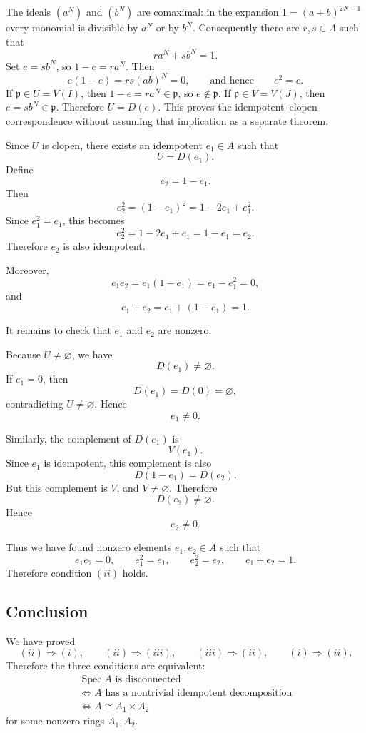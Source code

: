 The ideals $(a^N)$ and $(b^N)$ are comaximal: in the expansion
$1=(a+b)^{2N-1}$ every monomial is divisible by $a^N$ or by $b^N$.
Consequently there are $r,s\in A$ such that
\[
ra^N+sb^N=1.
\]
Set $e=sb^N$, so $1-e=ra^N$. Then
\[
e(1-e)=rs(ab)^N=0,
\qquad\text{and hence}\qquad e^2=e.
\]
If $\mathfrak p\in U=V(I)$, then $1-e=ra^N\in\mathfrak p$,
so $e\notin\mathfrak p$. If $\mathfrak p\in V=V(J)$, then
$e=sb^N\in\mathfrak p$. Therefore $U=D(e)$.
This proves the idempotent--clopen correspondence without assuming
that implication as a separate theorem.
	
	Since \(U\) is clopen, there exists an idempotent \(e_1\in A\) such that
	\[
	U=D(e_1).
	\]
	Define
	\[
	e_2=1-e_1.
	\]
	Then
	\[
	e_2^2=(1-e_1)^2
	=
	1-2e_1+e_1^2.
	\]
	Since \(e_1^2=e_1\), this becomes
	\[
	e_2^2
	=
	1-2e_1+e_1
	=
	1-e_1
	=
	e_2.
	\]
	Therefore \(e_2\) is also idempotent.
	
	Moreover,
	\[
	e_1e_2=e_1(1-e_1)=e_1-e_1^2=0,
	\]
	and
	\[
	e_1+e_2=e_1+(1-e_1)=1.
	\]
	
	It remains to check that \(e_1\) and \(e_2\) are nonzero.
	
	Because \(U\neq\varnothing\), we have
	\[
	D(e_1)\neq\varnothing.
	\]
	If \(e_1=0\), then
	\[
	D(e_1)=D(0)=\varnothing,
	\]
	contradicting \(U\neq\varnothing\). Hence
	\[
	e_1\neq 0.
	\]
	
	Similarly, the complement of \(D(e_1)\) is
	\[
	V(e_1).
	\]
	Since \(e_1\) is idempotent, this complement is also
	\[
	D(1-e_1)=D(e_2).
	\]
	But this complement is \(V\), and \(V\neq\varnothing\). Therefore
	\[
	D(e_2)\neq\varnothing.
	\]
	Hence
	\[
	e_2\neq 0.
	\]
	
	Thus we have found nonzero elements \(e_1,e_2\in A\) such that
	\[
	e_1e_2=0,
	\qquad
	e_1^2=e_1,
	\qquad
	e_2^2=e_2,
	\qquad
	e_1+e_2=1.
	\]
	Therefore condition \((ii)\) holds.
	
	\subsection*{Conclusion}
	
	We have proved
	\[
	(ii)\Rightarrow(i),
	\qquad
	(ii)\Rightarrow(iii),
	\qquad
	(iii)\Rightarrow(ii),
	\qquad
	(i)\Rightarrow(ii).
	\]
	Therefore the three conditions are equivalent:
\[
\boxed{\begin{gathered}
\operatorname{Spec} A \text{ is disconnected}\\
\iff A \text{ has a nontrivial idempotent decomposition}\\
\iff A\cong A_1\times A_2
\end{gathered}}
\]
	for some nonzero rings \(A_1,A_2\).
